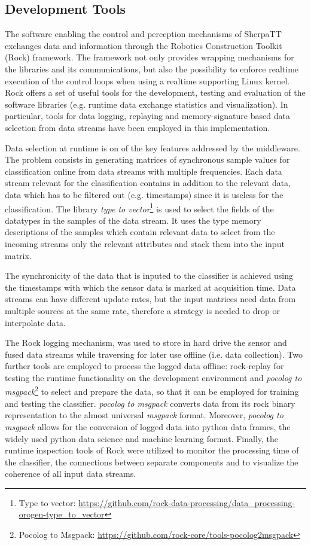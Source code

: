 \documentclass{article}
\begin{document}
\subsection{Development Tools}

The software enabling the control and perception mechanisms of SherpaTT exchanges data and information through the Robotics Construction Toolkit (Rock) framework. 
The framework not only provides wrapping mechanisms for the libraries and its communications, but also the possibility to enforce realtime execution of the control loops when using a realtime supporting Linux kernel. 
Rock offers a set of useful tools for the development, testing and evaluation of the software libraries (e.g. runtime data exchange statistics and visualization). 
In particular, tools for data logging, replaying and memory-signature based data selection from data streams have been employed in this implementation. 

Data selection at runtime is on of the key features addressed by the middleware. 
The problem consists in generating matrices of synchronous sample values for classification online from data streams with multiple frequencies.
Each data stream relevant for the classification contains in addition to the relevant data, data which has to be filtered out (e.g. timestamps) since it is useless for the classification.
The library \emph{type to vector}\footnote{Type to vector: \url{https://github.com/rock-data-processing/data_processing-orogen-type_to_vector}} is used to select the fields of the datatypes in the samples of the data stream. 
It uses the type memory descriptions of the samples which contain relevant data to select from the incoming streams only the relevant attributes and stack them into the input matrix. 

The synchronicity of the data that is inputed to the classifier is achieved using the timestamps with which the sensor data is marked at acquisition time.
Data streams can have different update rates, but the input matrices need data from multiple sources at the same rate, therefore a strategy is needed to drop or interpolate data. 

The Rock logging mechanism, was used to store in hard drive the sensor and fused data streams while traversing for later use offline (i.e. data collection). 
Two further tools are employed to process the logged data offline: rock-replay for testing the runtime functionality on the development environment and \emph{pocolog to msgpack}\footnote{Pocolog to Msgpack: \url{https://github.com/rock-core/tools-pocolog2msgpack}} to select and prepare the data, so that it can be employed for training and testing the classifier.
\emph{pocolog to msgpack} converts data from its rock binary representation to the almost universal \emph{msgpack} format.
Moreover, \emph{pocolog to msgpack} allows for the conversion of logged data into python data frames, the widely used python data science and machine learning format. 
Finally, the runtime inspection tools of Rock were utilized to monitor the processing time of the classifier, the connections between separate components and to visualize the coherence of all input data streams. 
\end{document}
